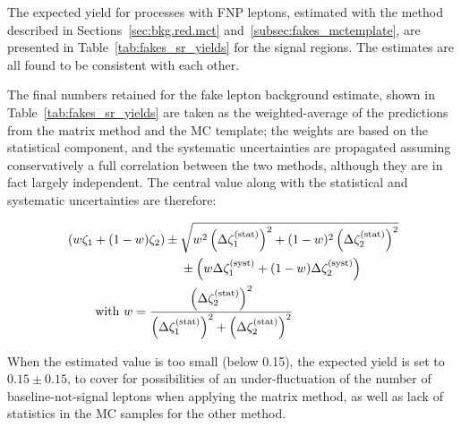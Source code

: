 The expected yield for processes with FNP leptons, 
estimated with the method described in 
Sections~\ref{sec:bkg.red.mct} and~\ref{subsec:fakes_mctemplate}, 
are presented in Table~\ref{tab:fakes_sr_yields} for the signal regions. 
The estimates are all found to be consistent with each other. 

The final numbers retained for the fake lepton background estimate,
shown in Table~\ref{tab:fakes_sr_yields}
are taken as the weighted-average of the predictions from the matrix method 
and the MC template; 
the weights are based on the statistical component, and the systematic 
uncertainties are propagated 
assuming conservatively a full correlation between the two methods, 
although they are in fact largely independent. 
The central value along with the statistical and systematic uncertainties 
are therefore: 

\begin{equation}
\begin{aligned}
& \left(w\zeta_1 + (1-w)\zeta_2\right) 
\pm \sqrt{w^2\left(\Delta\zeta_1^\text{(stat)}\right)^2 + (1-w)^2\left(\Delta\zeta_2^\text{(stat)}\right)^2} \\
&\hspace{3.225cm} \pm \left(w\Delta\zeta_1^\text{(syst)} + (1-w)\Delta\zeta_2^\text{(syst)}\right)\\
&\qquad\text{ with }w=\frac{\left(\Delta\zeta_2^\text{(stat)}\right)^2}{\left(\Delta\zeta_1^\text{(stat)}\right)^2+\left(\Delta\zeta_2^\text{(stat)}\right)^2}\notag
\end{aligned}
\end{equation}

When the estimated value is too small (below 0.15), the expected yield is set
 to $0.15\pm 0.15$, 
to cover for possibilities of an under-fluctuation of the number of
 baseline-not-signal leptons 
when applying the matrix method, as well as lack of statistics in the MC 
samples for the other method. 

